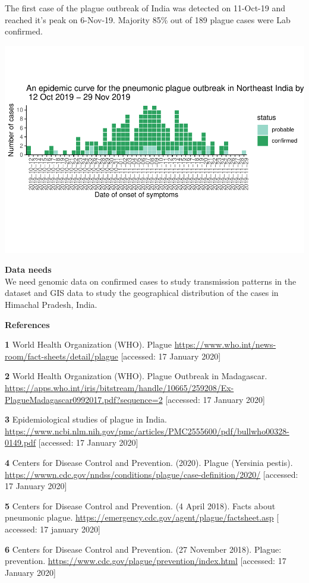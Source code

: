 \documentclass[
]{article}
\begin{document}
The first case of the plague outbreak of India was detected on 11-Oct-19
and reached it's peak on 6-Nov-19. Majority 85\% out of 189 plague cases
were Lab confirmed.

\includegraphics{Plague_SitRep_files/figure-latex/unnamed-chunk-3-1.pdf}

\textbf{Data needs}\\
We need genomic data on confirmed cases to study transmission patterns
in the dataset and GIS data to study the geographical distribution of
the cases in Himachal Pradesh, India.

\textbf{References}

\textbf{1} World Health Organization (WHO). Plague
\url{https://www.who.int/news-room/fact-sheets/detail/plague}
{[}accessed: 17 January 2020{]}

\textbf{2} World Health Organization (WHO). Plague Outbreak in
Madagascar.
\url{https://apps.who.int/iris/bitstream/handle/10665/259208/Ex-PlagueMadagascar0992017.pdf?sequence=2}
{[}accessed: 17 January 2020{]}

\textbf{3} Epidemiological studies of plague in India.
\url{https://www.ncbi.nlm.nih.gov/pmc/articles/PMC2555600/pdf/bullwho00328-0149.pdf}
{[}accessed: 17 January 2020{]}

\textbf{4} Centers for Disease Control and Prevention. (2020). Plague
(Yersinia pestis).
\url{https://wwwn.cdc.gov/nndss/conditions/plague/case-definition/2020/}
{[}accessed: 17 January 2020{]}

\textbf{5} Centers for Disease Control and Prevention. (4 April 2018).
Facts about pneumonic plague.
\url{https://emergency.cdc.gov/agent/plague/factsheet.asp} {[} accessed:
17 january 2020{]}

\textbf{6} Centers for Disease Control and Prevention. (27 November
2018). Plague: prevention.
\url{https://www.cdc.gov/plague/prevention/index.html} {[}accessed: 17
January 2020{]}
\end{document}
